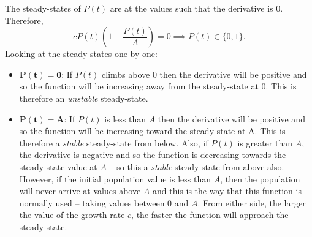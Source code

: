 \documentclass[../MathsNotesBase.tex]{subfiles}
\begin{document}
{\begin{exe}
{				The steady-states of $P(t)$ are at the values such that the derivative is 0. Therefore,
				\[  c P(t) \left( 1 - \frac{P(t)}{A} \right) = 0 \implies P(t) \in \{0,1\}. \]
				Looking at the steady-states one-by-one:
				\begin{itemize}
					\item{$\bm{ P(t) = 0 }$: If $P(t)$ climbs above 0 then the derivative will be positive and so the function will be increasing away from the steady-state at 0. This is therefore an \textit{unstable} steady-state.
					}
					\item{$\bm{ P(t) = A }$: If $P(t)$ is less than $A$ then the derivative will be positive and so the function will be increasing toward the steady-state at A. This is therefore a \textit{stable} steady-state from below. Also, if $P(t)$ is greater than $A$, the derivative is negative and so the function is decreasing towards the steady-state value at $A$ -- so this a \textit{stable} steady-state from above also. However, if the initial population value is less than $A$, then the population will never arrive at values above $A$ and this is the way that this function is normally used -- taking values between 0 and $A$. From either side, the larger the value of the growth rate $c$, the faster the function will approach the steady-state.
					}
				\end{itemize}
				
}
\end{exe}}
\end{document}

